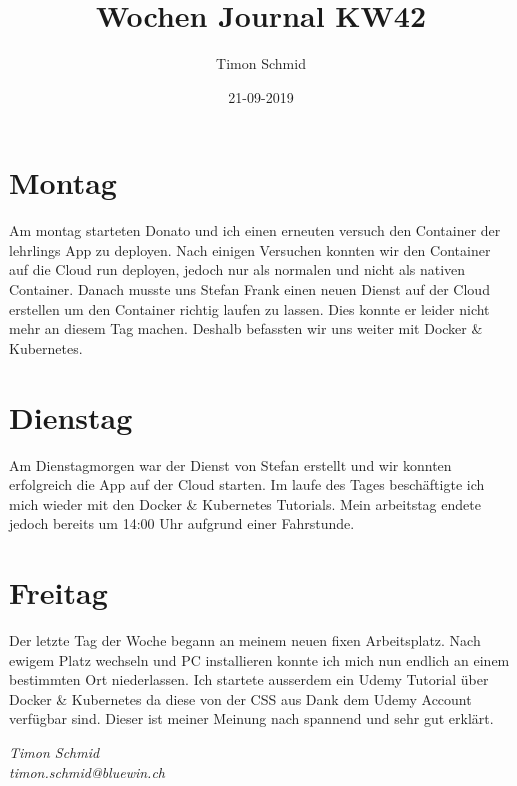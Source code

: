 \documentclass[12pt, titlepage]{article}
\title{Wochen Journal KW42}
\date{21-09-2019}
\author{Timon Schmid}
\begin{document}
    \maketitle

    \newpage


    \section{Montag}
    Am montag starteten Donato und ich einen erneuten versuch den Container der lehrlings
    App zu deployen. Nach einigen Versuchen konnten wir den Container auf die Cloud
    run deployen, jedoch nur als normalen und nicht als nativen Container. Danach musste
    uns Stefan Frank einen neuen Dienst auf der Cloud erstellen um den Container richtig
    laufen zu lassen. Dies konnte er leider nicht mehr an diesem Tag machen. Deshalb
    befassten wir uns weiter mit Docker & Kubernetes.

    \section{Dienstag}
    Am Dienstagmorgen war der Dienst von Stefan erstellt und wir konnten erfolgreich die
    App auf der Cloud starten. Im laufe des Tages beschäftigte ich mich wieder mit den
    Docker & Kubernetes Tutorials. Mein arbeitstag endete jedoch bereits um 14:00 Uhr
    aufgrund einer Fahrstunde.

    \section{Freitag}
    Der letzte Tag der Woche begann an meinem neuen fixen Arbeitsplatz. Nach ewigem Platz
    wechseln und PC installieren konnte ich mich nun endlich an einem bestimmten Ort
    niederlassen. Ich startete ausserdem ein Udemy Tutorial über Docker & Kubernetes da
    diese von der CSS aus Dank dem Udemy Account verfügbar sind. Dieser ist meiner Meinung
    nach spannend und sehr gut erklärt.

    \textit{Timon Schmid \\ timon.schmid@bluewin.ch}
\end{document}
